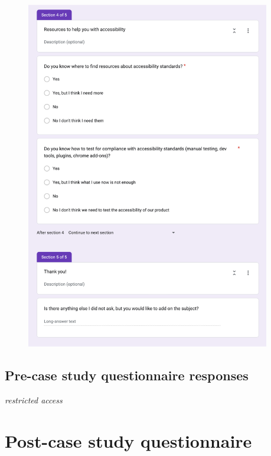 \documentclass{master_thesis}
\begin{document}
\begin{figure}[H]
	\centering
	\includegraphics[width=0.95\textwidth]{img/surveys/pre-survey-3.png}
\end{figure}
\clearpage

\subsection{Pre-case study questionnaire responses}\label{appendix:pre-survey-responses}
\textit{restricted access}

\section{Post-case study questionnaire }\label{appendix:post-survey}
\end{document}
